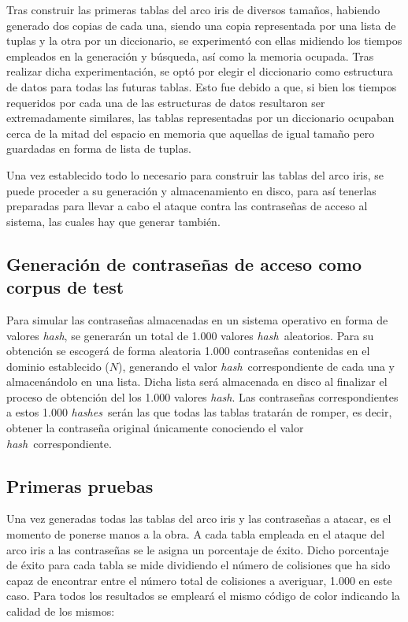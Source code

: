 \documentclass[12pt,spanish,listoffigures,listoftables,listofalgorithms]{tfgetsinf}
\newcommand{\hash}{\textit{hash}}
\newcommand{\hashes}{\textit{hashes}}
\begin{document}
Tras construir las primeras tablas del arco iris de diversos tamaños, habiendo generado dos copias de cada una, siendo una copia representada por una lista de tuplas y la otra por un diccionario, se experimentó con ellas midiendo los tiempos empleados en la generación y búsqueda, así como la memoria ocupada. Tras realizar dicha experimentación, se optó por elegir el diccionario como estructura de datos para todas las futuras tablas. Esto fue debido a que, si bien los tiempos requeridos por cada una de las estructuras de datos resultaron ser extremadamente similares, las tablas representadas por un diccionario ocupaban cerca de la mitad del espacio en memoria que aquellas de igual tamaño pero guardadas en forma de lista de tuplas.

Una vez establecido todo lo necesario para construir las tablas del arco iris, se puede proceder a su generación y almacenamiento en disco, para así tenerlas preparadas para llevar a cabo el ataque contra las contraseñas de acceso al sistema, las cuales hay que generar también.

\subsection{Generación de contraseñas de acceso como corpus de test} \label{contraseñas}

Para simular las contraseñas almacenadas en un sistema operativo en forma de valores \hash, se generarán un total de 1.000 valores \hash~aleatorios. Para su obtención se escogerá de forma aleatoria 1.000 contraseñas contenidas en el dominio establecido ($N$), generando el valor \hash~correspondiente de cada una y almacenándolo en una lista. Dicha lista será almacenada en disco al finalizar el proceso de obtención del los 1.000 valores \hash. Las contraseñas correspondientes a estos 1.000 \hashes~serán las que todas las tablas tratarán de romper, es decir, obtener la contraseña original únicamente conociendo el valor \hash~correspondiente.

\subsection{Primeras pruebas}\label{primeras pruebas}

Una vez generadas todas las tablas del arco iris y las contraseñas a atacar, es el momento de ponerse manos a la obra. A cada tabla empleada en el ataque del arco iris a las contraseñas se le asigna un porcentaje de éxito. Dicho porcentaje de éxito para cada tabla se mide dividiendo el número de colisiones que ha sido capaz de encontrar entre el número total de colisiones a averiguar, 1.000 en este caso. Para todos los resultados se empleará el mismo código de color indicando la calidad de los mismos:
\end{document}
